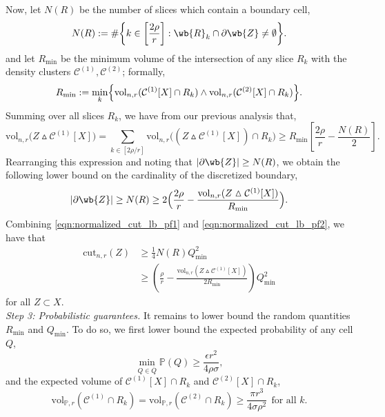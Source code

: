 \documentclass[twoside,11pt]{article}
\newcommand{\abs}[1]{\left \lvert #1 \right \rvert}
\newcommand{\1}{\mathbf{1}}
\newcommand{\mc}[1]{\mathcal{#1}}
\newcommand{\Pbb}{\mathbb{P}}
\newcommand{\vol}{\mathrm{vol}}
\newcommand{\cut}{\mathrm{cut}}
\begin{document}
Now, let $N(R)$ be the number of slices which contain a boundary cell,
\begin{equation*}
N(R) := \#\biggl\{k \in \biggl[\frac{2\rho}{r}\biggr]: \wb{R}_k \cap \partial \wb{Z} \neq \emptyset\biggr\}.
\end{equation*}
and let $R_{\min}$ be the minimum volume of the intersection of any slice $R_k$ with the density clusters $\mc{C}^{(1)}, \mc{C}^{(2)}$; formally,
\begin{equation}
\label{eqn:normalized_cut_lb_pf1.5}
R_{\min} := \min_{k}\Bigl\{\vol_{n,r}(\mc{C}^{(1)}[X] \cap R_k) \wedge \vol_{n,r}(\mc{C}^{(2)}[X] \cap R_k)\Bigr\}.
\end{equation} 
Summing over all slices $R_k$, we have from our previous analysis that,
\begin{equation*}
\vol_{n,r}\biggl(Z \vartriangle \mc{C}^{(1)}[X]\biggr) = \sum_{k \in [2\rho/r]} \vol_{n,r}\biggl( (Z \vartriangle \mc{C}^{(1)}[X]) \cap R_k\biggr) \geq R_{\min}  \left[\frac{2\rho}{r} - \frac{N(R)}{2}\right].
\end{equation*}
Rearranging this expression and noting that $\abs{\partial\wb{Z}} \geq N(R)$,  we obtain the following lower bound on the cardinality of the discretized boundary,
\begin{equation}
\label{eqn:normalized_cut_lb_pf2}
\abs{\partial\wb{Z}} \geq N(R) \geq 2\Bigl(\frac{2\rho}{r} - \frac{\vol_{n,r}(Z \vartriangle \mc{C}^{(1)}[X])}{R_{\min}}\Bigr).
\end{equation}
Combining \eqref{eqn:normalized_cut_lb_pf1} and \eqref{eqn:normalized_cut_lb_pf2}, we have that
\begin{align}
\cut_{n,r}(Z) & \geq \frac{1}{4}N(R) Q_{\min}^2 \nonumber \\
& \geq \left(\frac{\rho}{r} - \frac{\vol_{n,r}(Z \vartriangle \mc{C}^{(1)}[X])}{2R_{\min}}\right) Q_{\min}^2 \label{eqn:normalized_cut_lb_pf3}
\end{align}
for all $Z \subset X$.\\

\noindent \emph{Step 3: Probabilistic guarantees.}
It remains to lower bound the random quantities $R_{\min}$ and $Q_{\min}$.
To do so, we first lower bound the expected probability of any cell $Q$,
\begin{equation}
\label{eqn:normalized_cut_lb_pf4.5}
\min_{Q \in \overline{Q}} \Pbb(Q) \geq \frac{\epsilon r^2}{4 \rho \sigma},
\end{equation}
and the expected volume of $\mc{C}^{(1)}[X] \cap R_k$ and $\mc{C}^{(2)}[X] \cap R_k$,
\begin{equation}
\label{eqn:normalized_cut_lb_pf5}
\vol_{\Pbb,r}(\mc{C}^{(1)} \cap R_k) = \vol_{\Pbb,r}(\mc{C}^{(2)} \cap R_k) \geq \frac{\pi r^3}{4 \sigma \rho^2}~~\textrm{for all $k$.} 
\end{equation}
\end{document}
